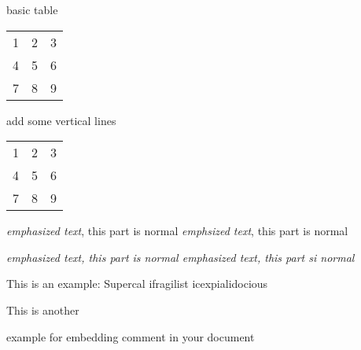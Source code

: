 \documentclass{article}
\begin{document}
basic table
\begin{tabular}{ l c r }
    1 & 2 & 3 \\
    4 & 5 & 6 \\
    7 & 8 & 9 \\
\end{tabular}

add some vertical lines
\begin{tabular}{ l | c || r }
    1 & 2 & 3 \\
    4 & 5 & 6 \\
    7 & 8 & 9 \\
\end{tabular}

\emph{emphasized text}, this part is normal %
{\em emphsized text}, this part is normal %

\em emphasized text, this part is normal %
\em{emphasized text}, this part si normal %

This is an %
example: Supercal%
ifragilist%
icexpialidocious

This is another
\begin{comment}
rather stupid,
but helpful
\end{comment}
example for embedding
comment in your document
\end{document}
